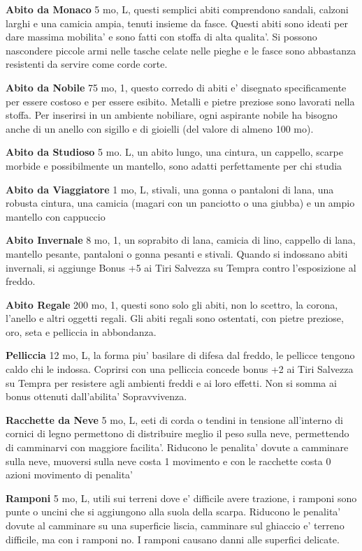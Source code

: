 \documentclass[a4paper,11pt,twoside,openany]{book}
\begin{document}
{		\textbf{Abito da Monaco} 5 mo, L, questi semplici abiti comprendono sandali, calzoni larghi e una camicia ampia, tenuti insieme da fasce. Questi abiti sono ideati per dare massima mobilita' e sono fatti con stoffa di alta qualita'. Si possono nascondere piccole armi nelle tasche celate nelle pieghe e le fasce sono abbastanza resistenti da servire come corde corte.
		
		\textbf{Abito da Nobile} 75 mo, 1, questo corredo di abiti e' disegnato specificamente per essere costoso e per essere esibito. Metalli e pietre preziose sono lavorati nella stoffa. Per inserirsi in un ambiente nobiliare, ogni aspirante nobile ha bisogno anche di un anello con sigillo e di gioielli (del valore di almeno 100 mo).
		
		\textbf{Abito da Studioso} 5 mo. L, un abito lungo, una cintura, un cappello, scarpe morbide e possibilmente un mantello, sono adatti perfettamente per chi studia
		
		\textbf{Abito da Viaggiatore} 1 mo, L, stivali, una gonna o pantaloni di lana, una robusta cintura, una camicia (magari con un panciotto o una giubba) e un ampio mantello con cappuccio
		
		\textbf{Abito Invernale} 8 mo, 1, un soprabito di lana, camicia di lino, cappello di lana, mantello pesante, pantaloni o gonna pesanti e stivali. Quando si indossano abiti invernali, si aggiunge Bonus +5 ai Tiri Salvezza su Tempra contro l'esposizione al freddo.
		
		\textbf{Abito Regale} 200 mo, 1,  questi sono solo gli abiti, non lo scettro, la corona, l'anello e altri oggetti regali. Gli abiti regali sono ostentati, con pietre preziose, oro, seta e pelliccia in abbondanza.
		
		\textbf{Pelliccia} 12 mo, L, la forma piu' basilare di difesa dal freddo, le pellicce tengono caldo chi le indossa. Coprirsi con una pelliccia concede bonus +2 ai Tiri Salvezza su Tempra per resistere agli ambienti freddi e ai loro effetti. Non si somma ai bonus ottenuti dall'abilita' Sopravvivenza.
		
		\textbf{Racchette da Neve} 5 mo, L, eeti di corda o tendini in tensione all'interno di cornici di legno permettono di distribuire meglio il peso sulla neve, permettendo di camminarvi con maggiore facilita'. Riducono le penalita' dovute a camminare sulla neve, muoversi sulla neve costa 1 movimento e con le racchette costa 0 azioni movimento di penalita'
		
		\textbf{Ramponi} 5 mo, L, utili sui terreni dove e' difficile avere trazione, i ramponi sono punte o uncini che si aggiungono alla suola della scarpa. Riducono le penalita' dovute al camminare su una superficie liscia, camminare sul ghiaccio e' terreno difficile, ma con i ramponi no. I ramponi causano danni alle superfici delicate.
		
}
\end{document}
